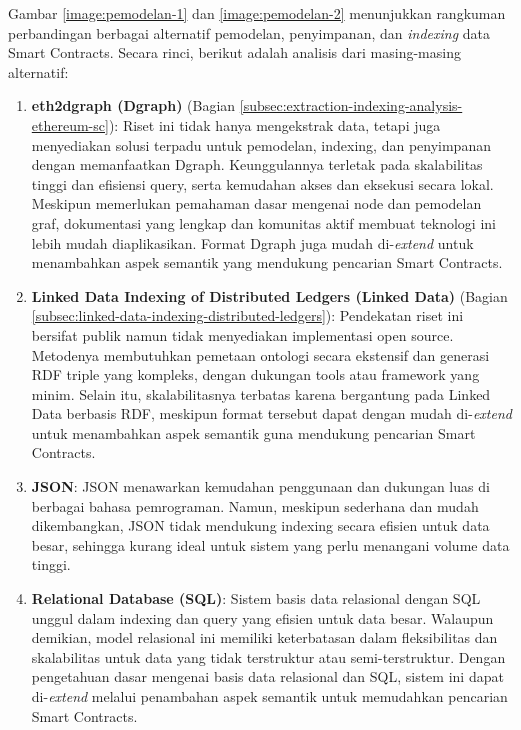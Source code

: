 Gambar \ref{image:pemodelan-1} dan \ref{image:pemodelan-2} menunjukkan rangkuman perbandingan berbagai alternatif pemodelan, penyimpanan, dan \textit{indexing} data Smart Contracts. Secara rinci, berikut adalah analisis dari masing-masing alternatif:

\begin{enumerate}
	\item \textbf{eth2dgraph (Dgraph)} \parencite{aimar2023extraction} (Bagian \ref{subsec:extraction-indexing-analysis-ethereum-sc}): Riset ini tidak hanya mengekstrak data, tetapi juga menyediakan solusi terpadu untuk pemodelan, indexing, dan penyimpanan dengan memanfaatkan Dgraph. Keunggulannya terletak pada skalabilitas tinggi dan efisiensi query, serta kemudahan akses dan eksekusi secara lokal. Meskipun memerlukan pemahaman dasar mengenai node dan pemodelan graf, dokumentasi yang lengkap dan komunitas aktif membuat teknologi ini lebih mudah diaplikasikan. Format Dgraph juga mudah di-\textit{extend} untuk menambahkan aspek semantik yang mendukung pencarian Smart Contracts.

	\item \textbf{Linked Data Indexing of Distributed Ledgers (Linked Data)} \parencite{third2017linked} (Bagian \ref{subsec:linked-data-indexing-distributed-ledgers}): Pendekatan riset ini bersifat publik namun tidak menyediakan implementasi open source. Metodenya membutuhkan pemetaan ontologi secara ekstensif dan generasi RDF triple yang kompleks, dengan dukungan tools atau framework yang minim. Selain itu, skalabilitasnya terbatas karena bergantung pada Linked Data berbasis RDF, meskipun format tersebut dapat dengan mudah di-\textit{extend} untuk menambahkan aspek semantik guna mendukung pencarian Smart Contracts.

	\item \textbf{JSON}: JSON menawarkan kemudahan penggunaan dan dukungan luas di berbagai bahasa pemrograman. Namun, meskipun sederhana dan mudah dikembangkan, JSON tidak mendukung indexing secara efisien untuk data besar, sehingga kurang ideal untuk sistem yang perlu menangani volume data tinggi.

	\item \textbf{Relational Database (SQL)}: Sistem basis data relasional dengan SQL unggul dalam indexing dan query yang efisien untuk data besar. Walaupun demikian, model relasional ini memiliki keterbatasan dalam fleksibilitas dan skalabilitas untuk data yang tidak terstruktur atau semi-terstruktur. Dengan pengetahuan dasar mengenai basis data relasional dan SQL, sistem ini dapat di-\textit{extend} melalui penambahan aspek semantik untuk memudahkan pencarian Smart Contracts.
\end{enumerate}
